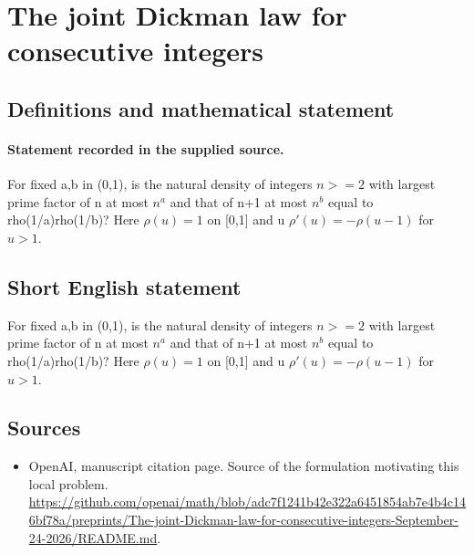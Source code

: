 \documentclass[11pt]{article}
\begin{document}
\section*{The joint Dickman law for consecutive integers}\label{30007267}
\subsection{Definitions and mathematical statement}
\paragraph{Statement recorded in the supplied source.}
For fixed a,b in (0,1), is the natural density of integers $n>=2$ with largest prime factor of n at most $n^a$ and that of n+1 at most $n^b$ equal to rho(1/a)rho(1/b)? Here $\rho (u)=1$ on [0,1] and u $\rho '(u)=-\rho (u-1)$ for $u>1$.
\subsection{Short English statement}
For fixed a,b in (0,1), is the natural density of integers $n>=2$ with largest prime factor of n at most $n^a$ and that of n+1 at most $n^b$ equal to rho(1/a)rho(1/b)? Here $\rho (u)=1$ on [0,1] and u $\rho '(u)=-\rho (u-1)$ for $u>1$.
\subsection{Sources}
\begin{itemize}
\item[S1] OpenAI, manuscript citation page. Source of the formulation motivating this local problem.
\url{https://github.com/openai/math/blob/adc7f1241b42e322a6451854ab7e4b4c146bf78a/preprints/The-joint-Dickman-law-for-consecutive-integers-September-24-2026/README.md}.
\end{itemize}
\end{document}
